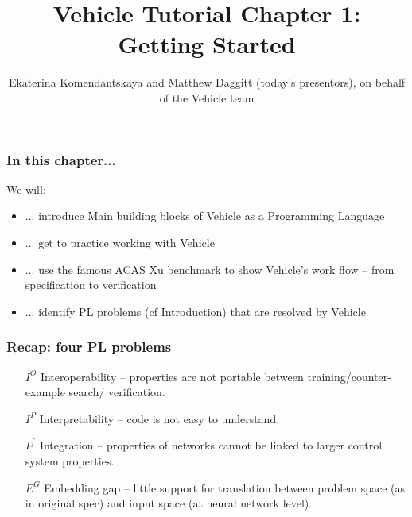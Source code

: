 \documentclass{beamer}
\title[Vehicle Tutorial Chapter 1]{Vehicle Tutorial Chapter 1: Getting Started}
\author[Vehicle]{Ekaterina Komendantskaya and Matthew Daggitt (today's presentors), on behalf of the Vehicle team}
\institute[]{}
\date[]{}
\newcommand\BackgroundPicture[1]{%
  \setbeamertemplate{background}{%
   \parbox[c][\paperheight]{\paperwidth}{%
      \vfill \hfill
\texttt{[image: \#1]}
        \hfill \vfill
     }}}
\begin{document}
\BackgroundPicture{logo1.png}

\begin{frame}
\titlepage
\end{frame}

\begin{frame}
\frametitle{In this chapter...}

We will:

\begin{itemize}[<+->]
\item  ... introduce Main building blocks of Vehicle as a Programming Language
\item ... get to practice working with Vehicle
\item ... use the famous ACAS Xu benchmark to show Vehicle's work flow --
from specification to verification
\item ... identify PL problems (cf Introduction) that are resolved by Vehicle

\end{itemize}

\end{frame}


\begin{frame}
\frametitle{Recap: four PL problems}

\pause
\begin{itemize}
\item[$I^O$] Interoperability -- properties are not portable between training/counter-example search/ verification.

\item[$I^{P}$] Interpretability -- code is not easy to understand.

\item[$I^{\int}$] Integration -- properties of networks cannot be linked to larger control system properties.

\item[$E^G$] Embedding gap -- little support for translation between problem space (as in original spec) and input space (at neural network level).
\end{itemize}
\end{frame}
\end{document}
